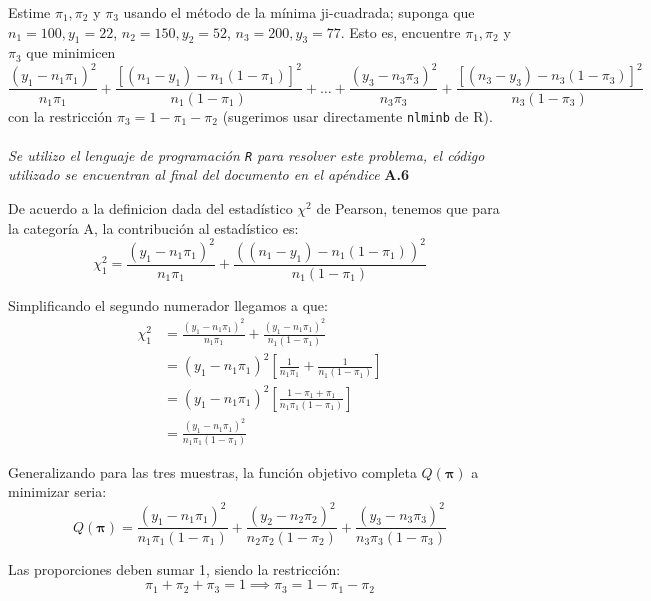 Estime $\pi_1, \pi_2$ y $\pi_3$ usando el método de la mínima ji-cuadrada; suponga que $n_1=100, y_1=22$, $n_2=150, y_2=52$, $n_3=200, y_3=77$. Esto es, encuentre $\pi_1, \pi_2$ y $\pi_3$ que minimicen
\begin{equation*}
\frac{(y_1 - n_1\pi_1)^2}{n_1\pi_1} + \frac{[(n_1 - y_1) - n_1(1 - \pi_1)]^2}{n_1(1 - \pi_1)} + 
\dots + \frac{(y_3 - n_3\pi_3)^2}{n_3\pi_3} + \frac{[(n_3 - y_3) - n_3(1 - \pi_3)]^2}{n_3(1 - \pi_3)}
\end{equation*}
con la restricción $\pi_3 = 1 - \pi_1 - \pi_2$ (sugerimos usar directamente \texttt{nlminb} de R).\\

\noindent{}\\

\textit{Se utilizo el lenguaje de programación \texttt{R} para resolver este problema, el código utilizado se encuentran al final del documento en el apéndice} \textbf{A.6}

De acuerdo a la definicion dada del estadístico $\chi^2$ de Pearson, tenemos que para la categoría A, la contribución al estadístico es:
\begin{equation}
    \chi^2_1 = \frac{(y_1 - n_1\pi_1)^2}{n_1\pi_1} + \frac{((n_1 - y_1) - n_1(1 - \pi_1))^2}{n_1(1 - \pi_1)}
\end{equation}

Simplificando el segundo numerador llegamos a que:
\begin{align*}
    \chi^2_1 &= \frac{(y_1 - n_1\pi_1)^2}{n_1\pi_1} + \frac{(y_1 - n_1\pi_1)^2}{n_1(1-\pi_1)}\\[0.1cm]
    &= (y_1 - n_1\pi_1)^2 \left[ \frac{1}{n_1\pi_1} + \frac{1}{n_1(1 - \pi_1)} \right] \\[0.1cm]
    &= (y_1 - n_1\pi_1)^2 \left[ \frac{1-\pi_1+\pi_1}{n_1\pi_1(1-\pi_1)} \right] \\[0.1cm]
    &= \frac{(y_1 - n_1\pi_1)^2}{n_1\pi_1(1-\pi_1)}
\end{align*}

Generalizando para las tres muestras, la función objetivo completa $Q(\boldsymbol{\pi})$ a minimizar seria:
\begin{equation}
Q(\boldsymbol{\pi}) = \frac{(y_1 - n_1\pi_1)^2}{n_1\pi_1(1-\pi_1)} + \frac{(y_2 - n_2\pi_2)^2}{n_2\pi_2(1-\pi_2)} + \frac{(y_3 - n_3\pi_3)^2}{n_3\pi_3(1-\pi_3)}
\end{equation}

Las proporciones deben sumar 1, siendo la restricción:
\begin{equation*}
    \pi_1 + \pi_2 + \pi_3 = 1 \implies \pi_3 = 1 - \pi_1 - \pi_2
\end{equation*}

